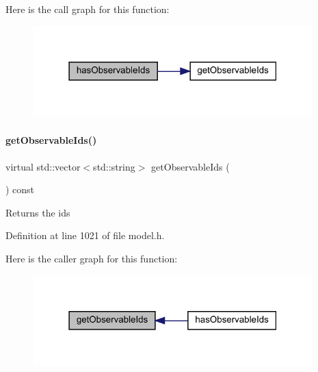 Here is the call graph for this function\+:
\nopagebreak
\begin{figure}[H]
\begin{center}
\leavevmode
\includegraphics[width=307pt]{classamici_1_1_model_adb0d2d3b3aa9cd648efa3cf408d9abab_cgraph}
\end{center}
\end{figure}
\mbox{\label{classamici_1_1_model_a13ff6d42168b4c62dedd27e274bf3192}} 
\paragraph{\texorpdfstring{get\+Observable\+Ids()}{getObservableIds()}}
{\footnotesize\ttfamily virtual std\+::vector$<$std\+::string$>$ get\+Observable\+Ids (\begin{DoxyParamCaption}{ }\end{DoxyParamCaption}) const\hspace{0.3cm}{\ttfamily [virtual]}}

\begin{DoxyReturn}{Returns}
the ids 
\end{DoxyReturn}


Definition at line 1021 of file model.\+h.

Here is the caller graph for this function\+:
\nopagebreak
\begin{figure}[H]
\begin{center}
\leavevmode
\includegraphics[width=307pt]{classamici_1_1_model_a13ff6d42168b4c62dedd27e274bf3192_icgraph}
\end{center}
\end{figure}
\mbox{\label{classamici_1_1_model_ab8e08cf804357e3ac070c11ac9b8ec35}} 
